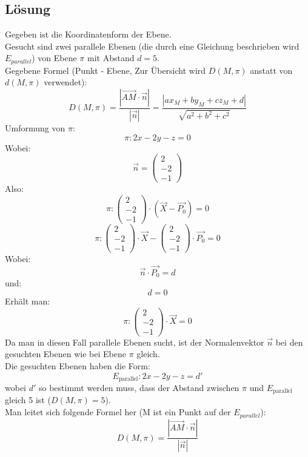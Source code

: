 \documentclass{article}
\begin{document}
\subsection*{Lösung}
Gegeben ist die Koordinatenform der Ebene. \\
Gesucht sind zwei parallele Ebenen (die durch eine Gleichung beschrieben wird \(E_{parallel}\)) von Ebene \(\pi\) mit Abstand \(d=5\). \\
Gegebene Formel (Punkt - Ebene, Zur Übersicht wird \(D\left(M,\pi \right)\) anstatt von \(d\left(M,\pi \right)\) verwendet):
\[D\left(M,\pi \right)=\frac{\left|\overrightarrow{AM}\cdot \vec{n}\right|}{\left|\vec{n}\right|}=\frac{\left|ax_{M}+by_{M}+cz_{M}+d\right|}{\sqrt{a^{2}+b^{2}+c^{2}}}\]
Umformung von \(\pi\):
\[\pi :2x-2y-z=0\]
Wobei:
\[\vec{n}=\begin{pmatrix} 2 \\ -2 \\ -1 \end{pmatrix}\]
Also:
\[\pi :\begin{pmatrix} 2 \\ -2 \\ -1 \end{pmatrix}\cdot \left(\overrightarrow{X}-\overrightarrow{P_0}\right)=0\]
\[\pi :\begin{pmatrix} 2 \\ -2 \\ -1 \end{pmatrix}\cdot\overrightarrow{X}-\begin{pmatrix} 2 \\ -2 \\ -1 \end{pmatrix}\cdot\overrightarrow{P_0}=0\]
Wobei:
\[\vec{n}\cdot\overrightarrow{P_0}=d\]
und:
\[d=0\]
Erhält man:
\[\pi :\begin{pmatrix} 2 \\ -2 \\ -1 \end{pmatrix}\cdot \overrightarrow{X}=0\]
Da man in diesen Fall parallele Ebenen sucht, ist der Normalenvektor \(\vec{n}\) bei den gesuchten Ebenen wie bei Ebene \(\pi\) gleich. \\
Die gesuchten Ebenen haben die Form:
\[E_{\text{parallel}}: 2x-2y-z=d'\]
wobei \(d'\) so bestimmt werden muss, dass der Abstand zwischen \(\pi\) und \(E_{\text{parallel}}\) gleich 5 ist (\(D\left(M,\pi \right)=5\)). \\
Man leitet sich folgende Formel her (M ist ein Punkt auf der \(E_{parallel}\)):
\[D\left(M,\pi \right)=\frac{\left|\overrightarrow{AM}\cdot \vec{n}\right|}{\left|\vec{n}\right|}\]
\end{document}
